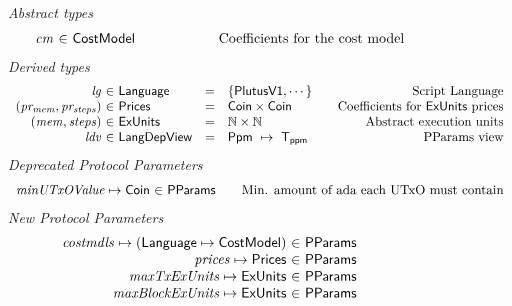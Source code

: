 \begin{figure*}[htb]
  \emph{Abstract types}
  \begin{equation*}
    \begin{array}{r@{~\in~}l@{\qquad\qquad\qquad}r}
      \var{cm} & \CostMod & \text{Coefficients for the cost model}
    \end{array}
  \end{equation*}
  \emph{Derived types}
  \begin{equation*}
    \begin{array}{r@{~\in~}l@{\quad=\quad}l@{\qquad}r}
      \var{lg}
      & \Language
      & \{\PlutusVI, \dotsb\}
      & \text{Script Language}
      \\
      \var{(pr_{mem}, pr_{steps})}
      & \Prices
      & \Coin \times \Coin
      & \text {Coefficients for $\ExUnits$ prices}
      \\
      \var{(mem, steps)}
      & \ExUnits
      & \N \times \N
      & \text{Abstract execution units}
      \\
      \var{ldv}
      & \LangDepView
      & \Ppm~\mapsto~\Tppm
      & \text{PParams view}
    \end{array}
  \end{equation*}
  \emph{Deprecated Protocol Parameters}
  \begin{equation*}
      \begin{array}{r@{~\in~}l@{\qquad}r}
        \var{minUTxOValue} \mapsto \Coin & \PParams & \text{Min. amount of ada each UTxO must contain}
      \end{array}
  \end{equation*}
  \emph{New Protocol Parameters}
  \begin{equation*}
      \begin{array}{r@{~\in~}l@{\qquad}r}
        \var{costmdls} \mapsto (\Language \mapsto \CostMod) & \PParams \\
        \var{prices} \mapsto \Prices & \PParams \\
        \var{maxTxExUnits} \mapsto \ExUnits & \PParams \\
        \var{maxBlockExUnits} \mapsto \ExUnits & \PParams \\

\end{array}
\end{equation*}
\end{figure*}
